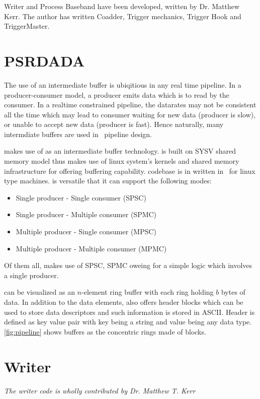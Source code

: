 \par Writer and Process Baseband have been developed, written by Dr. Matthew Kerr. The author has written Coadder, Trigger mechanics, Trigger Hook and TriggerMaster.

\section {PSRDADA}
\par The use of an intermediate buffer is ubiqitious in any real time pipeline. In a producer-consumer model, a producer emits data which is to read by the consumer. 
In a realtime constrained pipeline, the datarates may not be consistent all the time which may lead to consumer waiting for new data (producer is slow), or unable to accept new data (producer is fast).
Hence naturally, many intermdiate buffers are used in \vf~pipeline design.

\par \vf makes use of \dada as an intermediate buffer technology. \dada is built on SYSV shared memory model thus makes use of linux system's kernels and shared memory infrastructure for offering buffering capability. 
\dada codebase is in written in \cc~for linux type machines. \dada is versatile that it can support the following modes:
\begin{itemize}
\item Single producer - Single consumer (SPSC)
\item Single producer - Multiple consumer (SPMC)
\item Multiple producer - Single consumer (MPSC)
\item Multiple producer - Multiple consumer (MPMC)
\end{itemize}
Of them all, \vf makes use of SPSC, SPMC oweing for a simple logic which involves a single producer.

\par \dada can be visualized as an $n$-element ring buffer with each ring holding $b$ bytes of data. In addition to the data elements, \dada also offers header blocks which can be used to store data descriptors and such information is stored in ASCII.
Header is defined as key value pair with key being a string and value being any data type.
\autoref{fig:pipeline} shows \dada buffers as the concentric rings made of blocks.

\section {Writer} 
\label{sec:writer}
\hfill \emph {The writer code is wholly contributed by Dr. Matthew T. Kerr}


